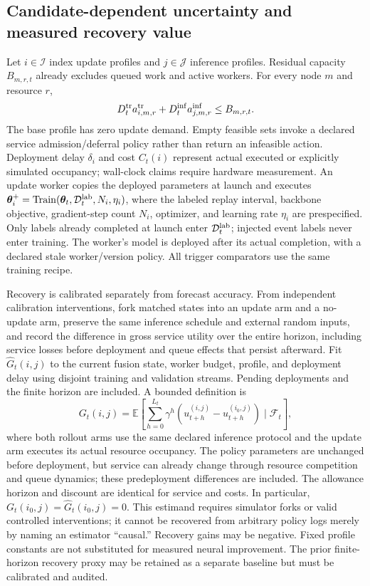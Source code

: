 \documentclass[10pt]{article}
\newcommand{\E}{\mathbb{E}}
\begin{document}
\subsection{Candidate-dependent uncertainty and measured recovery value}

Let $i\in\mathcal I$ index update profiles and $j\in\mathcal J$ inference
profiles. Residual capacity $B_{m,r,t}$ already excludes queued work and active
workers. For every node $m$ and resource $r$,
\begin{equation}
 D_t^{\rm tr}a^{\rm tr}_{i,m,r}
 +D_t^{\rm inf}a^{\rm inf}_{j,m,r}\le B_{m,r,t}.
 \label{eq:resource-feasibility}
\end{equation}
The base profile has zero update demand. Empty feasible sets invoke a declared
service admission/deferral policy rather than return an infeasible action.
Deployment delay $\delta_i$ and cost $C_t(i)$ represent actual executed or
explicitly simulated occupancy; wall-clock claims require hardware measurement.
An update worker copies the deployed parameters at launch and executes
$\boldsymbol\theta_i^+=\operatorname{Train}(\boldsymbol\theta_t,
\mathcal D_t^{\rm lab},N_i,\eta_i)$, where the labeled replay interval,
backbone objective, gradient-step count $N_i$, optimizer, and learning rate
$\eta_i$ are prespecified. Only labels already completed at launch enter
$\mathcal D_t^{\rm lab}$; injected event labels never enter training. The
worker's model is deployed after its actual completion, with a declared stale
worker/version policy. All trigger comparators use the same training recipe.

Recovery is calibrated separately from forecast accuracy. From independent
calibration interventions, fork matched states into an update arm and a no-update
arm, preserve the same inference schedule and external random inputs, and record
the difference in gross service utility over the entire horizon, including
service losses before deployment and queue effects that persist afterward. Fit
$\widehat G_t(i,j)$ to the current fusion state, worker budget, profile, and
deployment delay using disjoint training and validation streams. Pending
deployments and the finite horizon are included. A bounded definition is
\begin{equation}
 G_t(i,j)=\E\!\left[
 \sum_{h=0}^{L_t}\gamma^{h}
  (u_{t+h}^{(i,j)}-u_{t+h}^{(i_0,j)})\mid\mathcal F_t\right],
 \label{eq:measured-recovery}
\end{equation}
where both rollout arms use the same declared inference protocol and the
update arm executes its actual resource occupancy. The policy parameters are
unchanged before deployment, but service can already change through resource
competition and queue dynamics; these predeployment differences are included.
The allowance horizon and discount are identical for service and costs.
In particular, $G_t(i_0,j)=\widehat G_t(i_0,j)=0$.
This estimand requires simulator forks or valid controlled interventions; it
cannot be recovered from arbitrary policy logs merely by naming an estimator
``causal.'' Recovery gains may be negative. Fixed profile constants are not
substituted for measured neural improvement. The prior finite-horizon recovery
proxy may be retained as a separate baseline but must be calibrated and audited.
\end{document}
